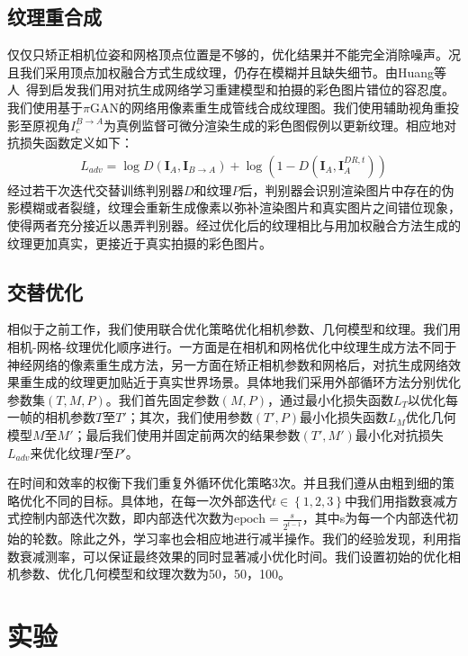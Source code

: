 \subsection{纹理重合成}
仅仅只矫正相机位姿和网格顶点位置是不够的，优化结果并不能完全消除噪声。况且我们采用顶点加权融合方式生成纹理，仍存在模糊并且缺失细节。由Huang等人~\cite{JingweiHuang2020AdversarialTO}得到启发我们用对抗生成网络学习重建模型和拍摄的彩色图片错位的容忍度。我们使用基于$\pi$GAN\cite{chanmonteiro2020pi-GAN}的网络用像素重生成管线合成纹理图。我们使用辅助视角重投影至原视角$I_c^{B\to A}$为真例监督可微分渲染生成的彩色图假例以更新纹理。相应地对抗损失函数定义如下：
\begin{align}
	L_{a d v}=\log D\left(\boldsymbol{I}_{A}, \boldsymbol{I}_{B \rightarrow A}\right)+\log \left(1-D\left(\boldsymbol{I}_{A}, \boldsymbol{I}_{A}^{D R, t}\right)\right) 
\end{align}
经过若干次迭代交替训练判别器$D$和纹理$P$后，判别器会识别渲染图片中存在的伪影模糊或者裂缝，纹理会重新生成像素以弥补渲染图片和真实图片之间错位现象，使得两者充分接近以愚弄判别器。经过优化后的纹理相比与用加权融合方法生成的纹理更加真实，更接近于真实拍摄的彩色图片。
\subsection{交替优化}
相似于之前工作，我们使用联合优化策略优化相机参数、几何模型和纹理。我们用相机-网格-纹理优化顺序进行。一方面是在相机和网格优化中纹理生成方法不同于神经网络的像素重生成方法，另一方面在矫正相机参数和网格后，对抗生成网络效果重生成的纹理更加贴近于真实世界场景。具体地我们采用外部循环方法分别优化参数集$(T,M,P)$。我们首先固定参数$(M,P)$，通过最小化损失函数$L_T$以优化每一帧的相机参数$T$至$T'$；其次，我们使用参数$(T',P)$最小化损失函数$L_M$优化几何模型$M$至$M'$；最后我们使用并固定前两次的结果参数$(T',M')$最小化对抗损失$L_{adv}$来优化纹理$P$至$P'$。\par
在时间和效率的权衡下我们重复外循环优化策略3次。并且我们遵从由粗到细的策略优化不同的目标。具体地，在每一次外部迭代$t\in \left \{ 1,2,3 \right \}$中我们用指数衰减方式控制内部迭代次数，即内部迭代次数为$\text{epoch}  =\frac{s}{2^{t-1}}$，其中s为每一个内部迭代初始的轮数。除此之外，学习率也会相应地进行减半操作。我们的经验发现，利用指数衰减测率，可以保证最终效果的同时显著减小优化时间。我们设置初始的优化相机参数、优化几何模型和纹理次数为50，50，100。

\section{实验}
